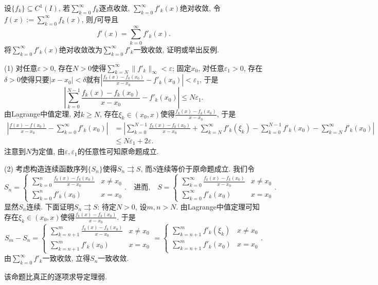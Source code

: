 \begin{exercise} \label{ex:于品p186_F5,F6}
	设$\{ f_k \} \subseteq C^1(I)$, 若$\sum_{k=0}^{\infty} f_k$逐点收敛, $\sum_{k=0}^{\infty} f'_k(x)$绝对收敛, 令$f(x):=\sum_{k=0}^{\infty} f_k(x)$, 则$f$可导且$$f'(x) = \sum_{k=0}^{\infty} f'_k(x).$$
	将$\sum_{k=0}^{\infty} f'_k(x)$绝对收敛改为$\sum_{k=0}^{\infty} f'_k$一致收敛, 证明或举出反例. 
\end{exercise}
\begin{solution}
	(1) 对任意$\varepsilon >0$, 存在$N>0$使得$\sum_{k=N}^{\infty} \| f'_k \|_{\infty} < \varepsilon$; 固定$x_0$, 对任意$\varepsilon _1>0$, 存在$\delta >0$使得只要$|x-x_0|<\delta$就有$|\frac{f_k(x)-f_k(x_0)}{x-x_0} - f'_k(x_0)|<\varepsilon _1$, 于是$$\left| \sum_{k=0}^{N-1} \frac{f_k(x)-f_k(x_0)}{x-x_0} - f'_k(x_0) \right| \leq N\varepsilon_1 .$$
	由Lagrange中值定理, 对$k\geq N$, 存在$\xi _k \in (x_0,x)$使得$\frac{f_k(x)-f_k(x_0)}{x-x_0}$, 于是
	\begin{align*}
		\left| \frac{f(x)-f(x_0)}{x-x_0} - \sum_{k=0}^{\infty} f'_k(x_0) \right| &= \left| \sum_{k=0}^{N-1} \frac{f_k(x)-f_k(x_0)}{x-x_0} + \sum_{k=N}^{\infty} f'_k(\xi _k) - \sum_{k=0}^{N-1} f'_k(x_0) - \sum_{k=N}^{\infty} f'_k(x_0) \right| \\
		&\leq N\varepsilon _1 + 2\varepsilon .
	\end{align*}
	注意到$N$为定值, 由$\varepsilon ,\varepsilon _1$的任意性可知原命题成立. 
	
	(2) 考虑构造连续函数序列$\{ S_n \}$使得$S_n \rightrightarrows S$, 而$S$连续等价于原命题成立. 我们令$$S_n = \begin{cases}
		\sum_{k=0}^{n} \frac{f_k(x)-f_k(x_0)}{x-x_0} & x \neq x_0 \\ \sum_{k=0}^{n} f'_k(x_0) & x=x_0
	\end{cases}.\quad \textit{进而,} \quad S = \begin{cases}
		\sum_{k=0}^{\infty} \frac{f_k(x)-f_k(x_0)}{x-x_0} & x \neq x_0 \\ \sum_{k=0}^{\infty} f'_k(x_0) & x=x_0
	\end{cases}. $$
	显然$S_n$连续. 下面证明$S_n \rightrightarrows S$: 待定$N>0$, 设$m,n >N$. 由Lagrange中值定理可知存在$\xi _k \in (x_0,x)$使得$\frac{f_k(x)-f_k(x_0)}{x-x_0}$. 于是$$S_m-S_n = \begin{cases}
		\sum_{k=n+1}^{m} \frac{f_k(x)-f_k(x_0)}{x-x_0} & x \neq x_0 \\ \sum_{k=n+1}^{m} f'_k(x_0) & x=x_0
	\end{cases} = \begin{cases}
		\sum_{k=n+1}^{m} f'_k(\xi _k) & x \neq x_0 \\ \sum_{k=n+1}^{m} f'_k(x_0) & x=x_0
	\end{cases}. $$
	由$\sum_{k=0}^{\infty} f'_k$一致收敛, 立得$S_n$一致收敛. 
\end{solution}
\begin{remark}
	该命题比真正的逐项求导定理弱. 
\end{remark}








